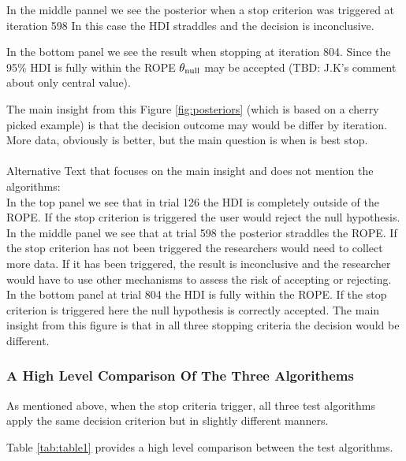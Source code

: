 In the middle pannel we see the posterior
when a stop criterion was triggered at iteration 598
In this case the HDI straddles and the decision is inconclusive.

In the bottom panel we see the result
when stopping at iteration 804.
Since the 95\% HDI is fully within the ROPE
$\theta_{\rm null}$ may be accepted (TBD: J.K's comment about only central value).

The main insight from this Figure \ref{fig:posteriors} (which is based on a 
cherry picked example) is that the decision outcome may would be differ by iteration.
More data, obviously is better, but the main question is when is best stop.
\\
\\
Alternative Text that focuses on the main insight and does not mention the algorithms:\\


In the top panel we see that in trial 126 the HDI is completely outside of the ROPE.
If the stop criterion is triggered the user would reject the null hypothesis.
In the middle panel we see that at trial 598 the posterior straddles the ROPE.
If the stop criterion has not been triggered the researchers would need to collect more
data. If it has been triggered, the result is inconclusive and the researcher would have
to use other mechanisms to assess the risk of accepting or rejecting. In the bottom
panel at trial 804 the HDI is fully within the ROPE. If the stop criterion is triggered
here the null hypothesis is correctly accepted. The main insight from this figure is
that in all three stopping criteria the decision would be different.

\subsubsection{A High Level Comparison Of The Three Algorithems}

As mentioned above, when the stop criteria trigger, all three test algorithms
apply the same decision criterion but in slightly different manners.


Table \ref{tab:table1} provides a high level comparison between the test algorithms.


